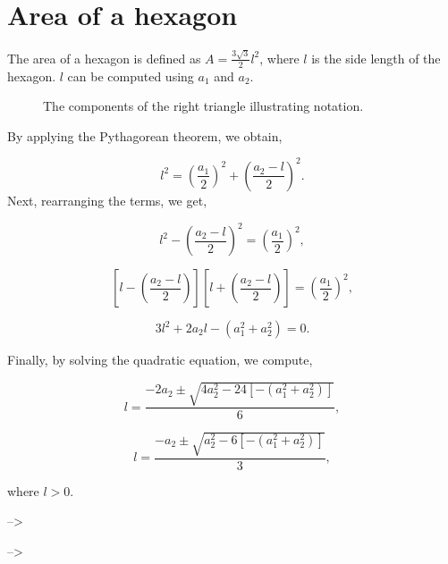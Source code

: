 \documentclass[
  12pt]{article}
\begin{document}
\newpage

\section{Area of a hexagon}\label{area-of-a-hexagon}

The area of a hexagon is defined as \(A = \frac{3\sqrt{3}}{2}l^2\),
where \(l\) is the side length of the hexagon. \(l\) can be computed
using \(a_1\) and \(a_2\).

\begin{figure}


\caption{\label{fig-tri-param}The components of the right triangle
illustrating notation.}

\end{figure}%

By applying the Pythagorean theorem, we obtain,

\[
l^2 = \left(\frac{a_1}{2}\right)^2 + \left(\frac{a_2 - l}{2}\right)^2.
\] Next, rearranging the terms, we get,

\[
l^2 - \left(\frac{a_2 - l}{2}\right)^2 = \left(\frac{a_1}{2}\right)^2,
\]

\[
\left[l - \left(\frac{a_2 - l}{2}\right)\right]\left[l + \left(\frac{a_2 - l}{2}\right)\right] = \left(\frac{a_1}{2}\right)^2,
\]

\[
3l^2 + 2a_2l - (a_1^2 + a_2^2) = 0.
\]

Finally, by solving the quadratic equation, we compute,

\[
l = \frac{-2a_2 \pm \sqrt{4a_2^2 - 24[-(a_1^2 + a_2^2)]}}{6},
\]

\[
l = \frac{-a_2 \pm \sqrt{a_2^2 - 6[-(a_1^2 + a_2^2)]}}{3},
\]

where \(l > 0\).

--\textgreater{}

--\textgreater{}
\end{document}
